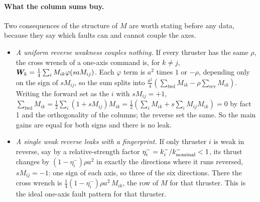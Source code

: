 \paragraph{What the column sums buy.} Two consequences of the structure of $M$
are worth stating before any data, because they say which faults can and cannot
couple the axes.
\begin{itemize}
  \item \emph{A uniform reverse weakness couples nothing.} If every thruster has
        the same $\rho$, the cross wrench of a one-axis command is, for $k\ne j$,
        $\bm{W}_k = \tfrac14\sum_i M_{ik}\varphi(saM_{ij})$. Each $\varphi$ term is
        $a^2$ times $1$ or $-\rho$, depending only on the sign of $sM_{ij}$, so
        the sum splits into $\tfrac{a^2}{4}(\sum_{\text{fwd}}M_{ik} -
        \rho\sum_{\text{rev}} M_{ik})$. Writing the forward set as the $i$ with
        $sM_{ij} = +1$, $\sum_{\text{fwd}} M_{ik} = \tfrac12\sum_i (1 + sM_{ij})M_{ik}
        = \tfrac12(\sum_i M_{ik} + s\sum_i M_{ij}M_{ik}) = 0$ by fact 1 and the
        orthogonality of the columns; the reverse set the same. So the main
        gains are equal for both signs and there is no leak.
  \item \emph{A single weak reverse leaks with a fingerprint.} If only thruster
        $i$ is weak in reverse, say by a relative-strength factor $\eta_i^-=k_i^-/k_{\rm nominal}^- < 1$, its thrust changes by
        $(1-\eta_i^-)\rho a^2$ in exactly the directions where it runs reversed,
        $sM_{ij} = -1$: one sign of each axis, so three of the six directions.
        There the cross wrench is $\tfrac14(1-\eta_i^-)\rho a^2\,M_{ik}$, the row of
        $M$ for that thruster. This is the ideal one-axis fault pattern for that thruster.
\end{itemize}


